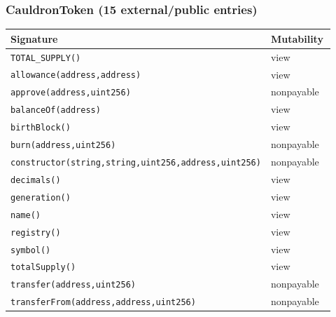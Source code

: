 \subsubsection*{CauldronToken \;\normalfont\small(15 external/public entries)}
\begin{longtable}{@{}p{0.62\linewidth}p{0.30\linewidth}@{}}
\toprule \textbf{Signature} & \textbf{Mutability} \\ \midrule \endhead
\texttt{\scriptsize TOTAL\_SUPPLY()} & view \\
\texttt{\scriptsize allowance(address,address)} & view \\
\texttt{\scriptsize approve(address,uint256)} & nonpayable \\
\texttt{\scriptsize balanceOf(address)} & view \\
\texttt{\scriptsize birthBlock()} & view \\
\texttt{\scriptsize burn(address,uint256)} & nonpayable \\
\texttt{\scriptsize constructor(string,string,uint256,address,uint256)} & nonpayable \\
\texttt{\scriptsize decimals()} & view \\
\texttt{\scriptsize generation()} & view \\
\texttt{\scriptsize name()} & view \\
\texttt{\scriptsize registry()} & view \\
\texttt{\scriptsize symbol()} & view \\
\texttt{\scriptsize totalSupply()} & view \\
\texttt{\scriptsize transfer(address,uint256)} & nonpayable \\
\texttt{\scriptsize transferFrom(address,address,uint256)} & nonpayable \\
\bottomrule\end{longtable}

